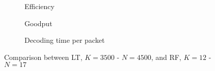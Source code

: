 \begin{figure}[t]
\centering
\begin{subfigure}{0.23\textwidth}
	\captionsetup{justification=centering,font=scriptsize}
	\centering
	\setlength\fwidth{\textwidth}
	\setlength{}
	
	\caption{Efficiency}
	\label{fig:RF_eff}
\end{subfigure}\hspace{2em}%
\begin{subfigure}{0.23\textwidth}
	\captionsetup{justification=centering,font=scriptsize}
	\centering
	\setlength\fwidth{\textwidth}
	\setlength{}
	
	\caption{Goodput}
	\label{fig:RF_good}
\end{subfigure}\hspace{2em}%
\begin{subfigure}{0.23\textwidth}
	\captionsetup{justification=centering,font=scriptsize}
	\centering
	\setlength\fwidth{\textwidth}
	\setlength{}
	\caption{Decoding time per packet}
	\label{fig:RFLT_dectime}
\end{subfigure}
\caption{Comparison between LT, $K=3500$ - $N=4500$, and RF, $K=12$ - $N=17$}
\label{fig:RFLT}
\end{figure}